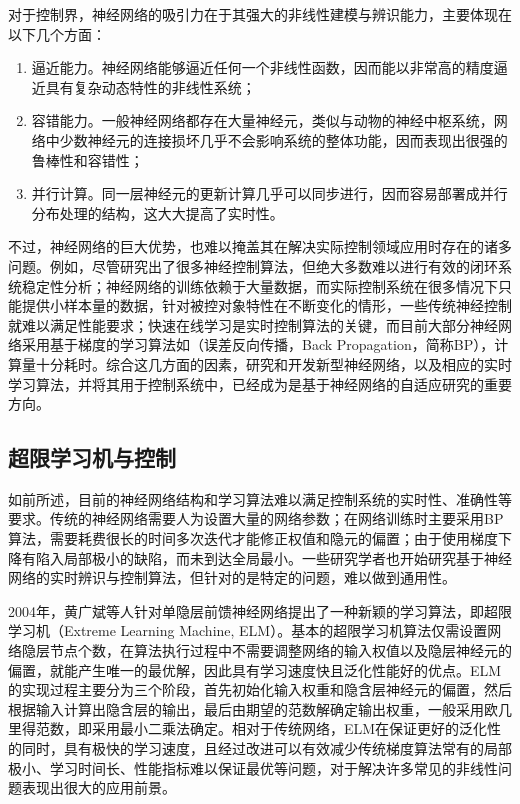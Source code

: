 对于控制界，神经网络的吸引力在于其强大的非线性建模与辨识能力，主要体现在以下几个方面：
\begin{enumerate}
\item 逼近能力。神经网络能够逼近任何一个非线性函数，因而能以非常高的精度逼近具有复杂动态特性的非线性系统；
\item 容错能力。一般神经网络都存在大量神经元，类似与动物的神经中枢系统，网络中少数神经元的连接损坏几乎不会影响系统的整体功能，因而表现出很强的鲁棒性和容错性；
\item 并行计算。同一层神经元的更新计算几乎可以同步进行，因而容易部署成并行分布处理的结构，这大大提高了实时性。
\end{enumerate}

不过，神经网络的巨大优势，也难以掩盖其在解决实际控制领域应用时存在的诸多问题。例如，尽管研究出了很多神经控制算法，但绝大多数难以进行有效的闭环系统稳定性分析；神经网络的训练依赖于大量数据，而实际控制系统在很多情况下只能提供小样本量的数据，针对被控对象特性在不断变化的情形，一些传统神经控制就难以满足性能要求；快速在线学习是实时控制算法的关键，而目前大部分神经网络采用基于梯度的学习算法如（误差反向传播，Back Propagation，简称BP），计算量十分耗时。综合这几方面的因素，研究和开发新型神经网络，以及相应的实时学习算法，并将其用于控制系统中，已经成为是基于神经网络的自适应研究的重要方向。

\subsection{超限学习机与控制}

如前所述，目前的神经网络结构和学习算法难以满足控制系统的实时性、准确性等要求。传统的神经网络需要人为设置大量的网络参数；在网络训练时主要采用BP算法，需要耗费很长的时间多次迭代才能修正权值和隐元的偏置；由于使用梯度下降有陷入局部极小的缺陷，而未到达全局最小。一些研究学者也开始研究基于神经网络的实时辨识与控制算法，但针对的是特定的问题，难以做到通用性。

2004年，黄广斌等人针对单隐层前馈神经网络提出了一种新颖的学习算法，即超限学习机（Extreme Learning Machine, ELM）。基本的超限学习机算法仅需设置网络隐层节点个数，在算法执行过程中不需要调整网络的输入权值以及隐层神经元的偏置，就能产生唯一的最优解，因此具有学习速度快且泛化性能好的优点。ELM的实现过程主要分为三个阶段，首先初始化输入权重和隐含层神经元的偏置，然后根据输入计算出隐含层的输出，最后由期望的范数解确定输出权重，一般采用欧几里得范数，即采用最小二乘法确定。相对于传统网络，ELM在保证更好的泛化性的同时，具有极快的学习速度，且经过改进可以有效减少传统梯度算法常有的局部极小、学习时间长、性能指标难以保证最优等问题，对于解决许多常见的非线性问题表现出很大的应用前景。


